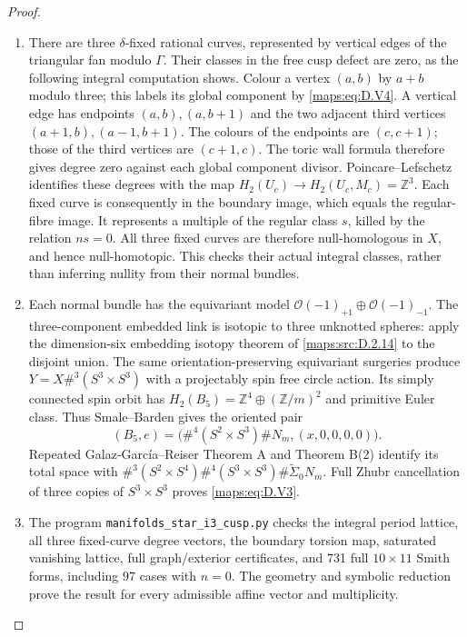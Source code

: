 \begin{proof}
\begin{enumerate}[label=\arabic*.,leftmargin=*]
\item There are three $\delta$-fixed rational curves, represented
by vertical edges of the triangular fan modulo $\Gamma$.
Their classes in the free cusp defect are zero, as the
following integral computation shows. Colour a vertex
$(a,b)$ by $a+b$ modulo three; this labels its global
component by \eqref{maps:eq:D.V4}. A vertical edge has endpoints
$(a,b),(a,b+1)$ and the two adjacent third vertices
$(a+1,b),(a-1,b+1)$. The colours of the endpoints are
$(c,c+1)$; those of the third vertices are $(c+1,c)$.
The toric wall formula therefore gives degree zero
against each global component divisor. Poincare--Lefschetz
identifies these degrees with the map
$H_2(U_c)\to H_2(U_c,M_c)=\mathbb Z^3$.
Each fixed curve is consequently in the boundary image,
which equals the regular-fibre image. It represents a
multiple of the regular class $s$, killed by the relation
$ns=0$. All three fixed curves are therefore null-homologous
in $X$, and hence null-homotopic. This checks their actual
integral classes, rather than inferring nullity from their
normal bundles.

\item Each normal bundle has the equivariant model
$\mathcal O(-1)_{+1}\oplus\mathcal O(-1)_{-1}$.
The three-component embedded link is isotopic to three
unknotted spheres: apply the dimension-six embedding
isotopy theorem of \ref{maps:src:D.2.14} to the disjoint union.
The same orientation-preserving equivariant surgeries
produce
$Y=X\#^3(S^3\times S^3)$ with a projectably spin free
circle action. Its simply connected spin orbit has
$H_2(B_5)=\mathbb Z^4\oplus(\mathbb Z/m)^2$ and primitive
Euler class. Thus Smale--Barden gives the oriented pair
\[
 (B_5,e)=\bigl(\#^4(S^2\times S^3)\#N_m,
                                      (x,0,0,0,0)\bigr).
\]
Repeated Galaz-Garc\'ia--Reiser Theorem A and Theorem B(2)
identify its total space with
$\#^3(S^2\times S^4)\#^4(S^3\times S^3)
\#\widetilde\Sigma_0N_m$.
Full Zhubr cancellation of three copies of $S^3\times S^3$
proves \eqref{maps:eq:D.V3}.

\item The program \texttt{manifolds\_star\_i3\_cusp.py} checks
the integral period lattice, all three fixed-curve degree
vectors, the boundary torsion map, saturated vanishing
lattice, full graph/exterior certificates, and 731 full
$10\times11$ Smith forms, including 97 cases with $n=0$.
The geometry and symbolic reduction prove the result
for every admissible affine vector and multiplicity.
\end{enumerate}
\end{proof}

